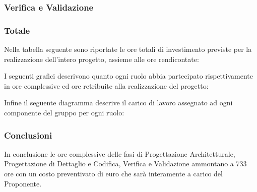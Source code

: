 \subsubsection{Verifica e Validazione}






\subsubsection{Totale}
Nella tabella seguente sono riportate le ore totali di investimento previste per la realizzazione dell'intero progetto, assieme alle ore rendicontate:

I seguenti grafici descrivono quanto ogni ruolo abbia partecipato rispettivamente in ore complessive ed ore retribuite alla realizzazione del progetto: 

Infine il seguente diagramma descrive il carico di lavoro assegnato ad ogni componente del gruppo per ogni ruolo:

\subsubsection{Conclusioni}
In conclusione le ore complessive delle fasi di Progettazione Architetturale, Progettazione di Dettaglio e Codifica, Verifica e Validazione ammontano a 733 ore con un costo preventivato di euro  che sarà interamente a carico del Proponente. 